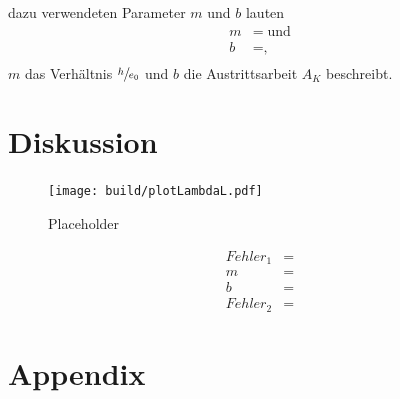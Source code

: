     \justifying dazu verwendeten Parameter $m$ und $b$ lauten
    \begin{align}
    m &= \text{}\;\text{und} \label{eq:20}\\
    b &= \text{,} \label{eq:21}\\
    \end{align}
    \justifying $m$ das Verhältnis $\sfrac{h}{e_0}$ und $b$ die Austrittsarbeit $A_K$ beschreibt.

\newpage
\section{Diskussion}

    \flushleft{\;}\justifying

    \begin{figure}[H]
        \centering
        \texttt{[image: build/plotLambdaL.pdf]}
        \caption{Placeholder}
        \label{fig:10}
    \end{figure}

    \begin{align}
    Fehler_1 &= \text{}\\
    m &= \text{}\\
    b &= \text{}\\
    Fehler_2 &= \text{}   
    \end{align}

\newpage
\printbibliography

\newpage
\section{Appendix}

\begin{table}[H]
    \centering
    \caption{}
    
    \label{tab:1}
\end{table}

\begin{table}[H]
    \centering
    \caption{}
    
    \label{tab:2}
\end{table}

\begin{table}[H]
    \centering
    \caption{}
    
    \label{tab:3}
\end{table}




